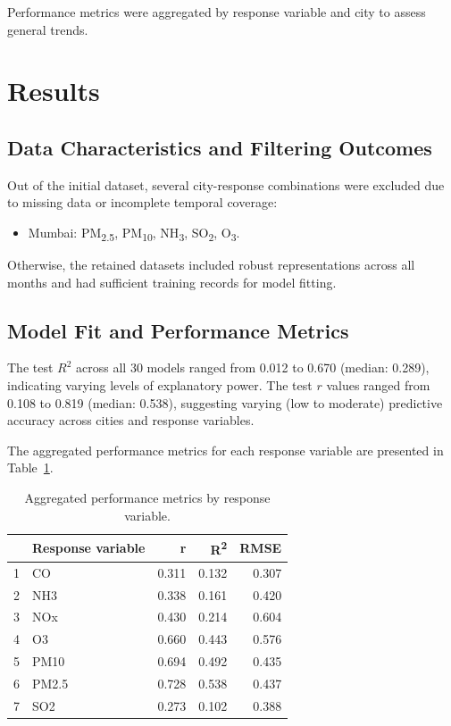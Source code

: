 \documentclass[twoside,11pt]{article}
\begin{document}
Performance metrics were aggregated by response variable and city to assess general trends.

\section{Results}

\subsection{Data Characteristics and Filtering Outcomes}

Out of the initial dataset, several city-response combinations were excluded due to missing data or incomplete temporal coverage:

\begin{itemize}
  \item Mumbai: PM\textsubscript{2.5}, PM\textsubscript{10}, NH\textsubscript{3}, SO\textsubscript{2}, O\textsubscript{3}.
\end{itemize}

Otherwise, the retained datasets included robust representations across all months and had sufficient training records for model fitting.

\subsection{Model Fit and Performance Metrics}

The test $R^2$ across all 30 models ranged from 0.012 to 0.670 (median: 0.289), indicating varying levels of explanatory power. The test $r$ values ranged from 0.108 to 0.819 (median: 0.538), suggesting varying (low to moderate) predictive accuracy across cities and response variables.

The aggregated performance metrics for each response variable are presented in Table~\ref{tab:performance_metrics_by_variable}.

\begin{table}[ht]
\centering
\begin{tabular}{rlrrr}
  \hline
  & Response variable & r & R\textsuperscript{2} & RMSE \\
  \hline
  1 & CO & 0.311 & 0.132 & 0.307 \\ 
  2 & NH3 & 0.338 & 0.161 & 0.420 \\ 
  3 & NOx & 0.430 & 0.214 & 0.604 \\ 
  4 & O3 & 0.660 & 0.443 & 0.576 \\ 
  5 & PM10 & 0.694 & 0.492 & 0.435 \\ 
  6 & PM2.5 & 0.728 & 0.538 & 0.437 \\ 
  7 & SO2 & 0.273 & 0.102 & 0.388 \\ 
    \hline
\end{tabular}
\caption{Aggregated performance metrics by response variable.}
\label{tab:performance_metrics_by_variable}
\end{table}
\end{document}
